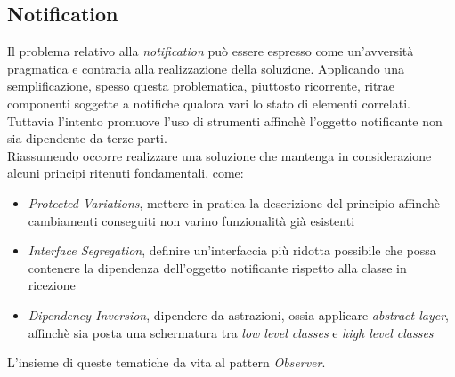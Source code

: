 \documentclass{article}
\begin{document}
\subsection*{Notification}
\large
Il problema relativo alla \textit{notification} può essere espresso come un'avversità pragmatica e contraria alla realizzazione della soluzione. Applicando una semplificazione, spesso questa problematica, piuttosto ricorrente, ritrae componenti soggette a notifiche qualora vari lo stato di elementi correlati. Tuttavia l'intento promuove l'uso di strumenti affinchè l'oggetto notificante non sia dipendente da terze parti.\vspace*{14pt}\\
Riassumendo occorre realizzare una soluzione che mantenga in considerazione alcuni principi ritenuti fondamentali, come:
\begin{itemize}[label={-}]
    \itemsep0em
    \item \textit{Protected Variations}, mettere in pratica la descrizione del principio affinchè cambiamenti conseguiti non varino funzionalità già esistenti
    \item \textit{Interface Segregation}, definire un'interfaccia più ridotta possibile che possa contenere la dipendenza dell'oggetto notificante rispetto alla classe in ricezione
    \item \textit{Dipendency Inversion}, dipendere da astrazioni, ossia applicare \textit{abstract layer}, affinchè sia posta una schermatura tra \textit{low level classes} e \textit{high level classes}
\end{itemize}
L'insieme di queste tematiche da vita al pattern \textit{Observer}.
\end{document}
